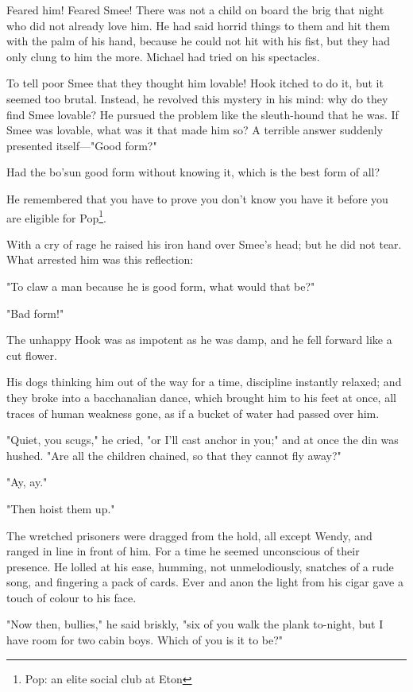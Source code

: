 Feared him!
Feared Smee!
There was not a child on board the brig that night who did not already love him.
He had said horrid things to them and hit them with the palm of his hand, because he could not hit with his fist,
but they had only clung to him the more.
Michael had tried on his spectacles.

To tell poor Smee that they thought him lovable!
Hook itched to do it, but it seemed too brutal.
Instead, he revolved this mystery in his mind:
why do they find Smee lovable?
He pursued the problem like the sleuth-hound that he was.
If Smee was lovable, what was it that made him so?
A terrible answer suddenly presented itself—"Good form?"

Had the bo'sun good form without knowing it, which is the best form of all?

He remembered that you have to prove you don't know you have it
before you are eligible for Pop\footnote{Pop: an elite social club at Eton}.

With a cry of rage he raised his iron hand over Smee's head;
but he did not tear.
What arrested him was this reflection:

"To claw a man because he is good form, what would that be?"

"Bad form!"

The unhappy Hook was as impotent as he was damp, and he fell forward like a cut flower.

His dogs thinking him out of the way for a time, discipline instantly relaxed;
and they broke into a bacchanalian dance,
which brought him to his feet at once, all traces of human weakness gone,
as if a bucket of water had passed over him.

"Quiet, you scugs," he cried, "or I'll cast anchor in you;"
and at once the din was hushed.
"Are all the children chained, so that they cannot fly away?"

"Ay, ay."

"Then hoist them up."

The wretched prisoners were dragged from the hold, all except Wendy,
and ranged in line in front of him.
For a time he seemed unconscious of their presence.
He lolled at his ease, humming, not unmelodiously, snatches of a rude song,
and fingering a pack of cards.
Ever and anon the light from his cigar gave a touch of colour to his face.

"Now then, bullies," he said briskly, "six of you walk the plank to-night,
but I have room for two cabin boys.
Which of you is it to be?"

